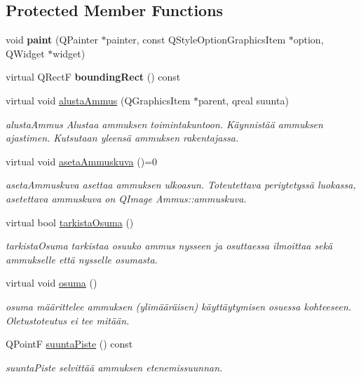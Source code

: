 \subsection*{Protected Member Functions}
\begin{DoxyCompactItemize}
\item 
\hypertarget{class_ammus_a43f17fae41260e222e2c291ae9921516}{void {\bfseries paint} (Q\-Painter $\ast$painter, const Q\-Style\-Option\-Graphics\-Item $\ast$option, Q\-Widget $\ast$widget)}\label{class_ammus_a43f17fae41260e222e2c291ae9921516}

\item 
\hypertarget{class_ammus_ad6879b5760f9f1b00f0dad26a693bf5a}{virtual Q\-Rect\-F {\bfseries bounding\-Rect} () const }\label{class_ammus_ad6879b5760f9f1b00f0dad26a693bf5a}

\item 
virtual void \hyperlink{class_ammus_aeba3c164d8cd35b3937496904780e3f0}{alusta\-Ammus} (Q\-Graphics\-Item $\ast$parent, qreal suunta)
\begin{DoxyCompactList}\small\item\em alusta\-Ammus Alustaa ammuksen toimintakuntoon. Käynnistää ammuksen ajastimen. Kutsutaan yleensä ammuksen rakentajassa. \end{DoxyCompactList}\item 
virtual void \hyperlink{class_ammus_a637789fc7748679d5e6ceeb7bb2d24a4}{aseta\-Ammuskuva} ()=0
\begin{DoxyCompactList}\small\item\em aseta\-Ammuskuva asettaa ammuksen ulkoasun. Toteutettava periytetyssä luokassa, asetettava ammuskuva on Q\-Image Ammus\-::ammuskuva. \end{DoxyCompactList}\item 
virtual bool \hyperlink{class_ammus_a60d382b563f273bb90c60c4a5b396210}{tarkista\-Osuma} ()
\begin{DoxyCompactList}\small\item\em tarkista\-Osuma tarkistaa osuuko ammus nysseen ja osuttaessa ilmoittaa sekä ammukselle että nysselle osumasta. \end{DoxyCompactList}\item 
virtual void \hyperlink{class_ammus_a81ad352e18b9b3acebd307d5c46d40ba}{osuma} ()
\begin{DoxyCompactList}\small\item\em osuma määrittelee ammuksen (ylimääräisen) käyttäytymisen osuessa kohteeseen. Oletustoteutus ei tee mitään. \end{DoxyCompactList}\item 
Q\-Point\-F \hyperlink{class_ammus_a1195266d54d90cc1080db00ba425f717}{suunta\-Piste} () const 
\begin{DoxyCompactList}\small\item\em suunta\-Piste selvittää ammuksen etenemissuunnan. \end{DoxyCompactList}\end{DoxyCompactItemize}
